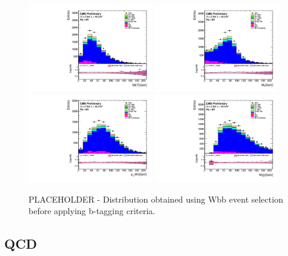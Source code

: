 \begin{figure}[htbp]
	\centering
		\includegraphics[width=0.48\textwidth]{Figures/Results/TT_GetMET_doQCD1.pdf}
		\includegraphics[width=0.48\textwidth]{Figures/Results/TT_GetVMt_doQCD1.pdf}
		\includegraphics[width=0.48\textwidth]{Figures/Results/TT_GetWpt_doQCD1.pdf}
		\includegraphics[width=0.48\textwidth]{Figures/Results/TT_H_mass_doQCD1.pdf}		
	\caption[Distribution obtained using Wbb event selection before applying b-tagging criteria.]{PLACEHOLDER - Distribution obtained using Wbb event selection before applying b-tagging criteria.}
	\label{fig:Wjets}
\end{figure}

\subsection{QCD}

